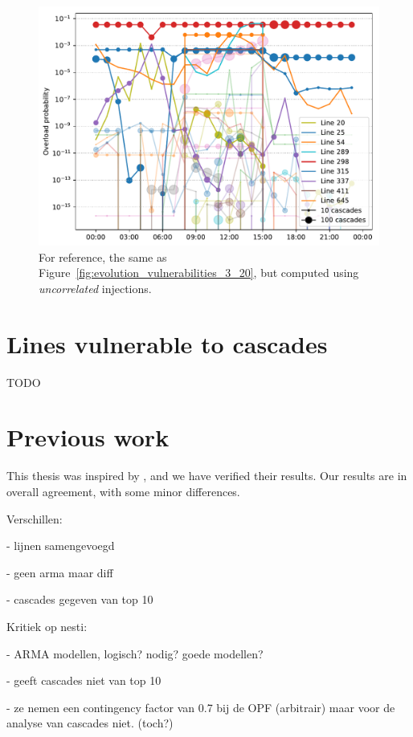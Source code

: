 \documentclass[main.tex]{subfiles}
\begin{document}
\begin{figure}[ht]
    \centering
    \includegraphics[width=\textwidth]{img/evolution_overload_probs_3_20_IID.pdf}
    \caption{For reference, the same as Figure~\ref{fig:evolution_vulnerabilities_3_20}, but computed using \emph{uncorrelated} injections.}\label{fig:evolution_vulnerabilities_3_20_IID}
\end{figure}


\section{Lines vulnerable to cascades}
\towrite{}


\begin{table}

\caption{TODO}
\label{tab:top20old}
\end{table}

\section{Previous work}
This thesis was inspired by \cite{Nesti2018emergentfailures}, and we have verified their results. Our results are in overall agreement, with some minor differences. 

Verschillen:

- lijnen samengevoegd

- geen arma maar diff

- cascades gegeven van top 10


Kritiek op nesti:

- ARMA modellen, logisch? nodig? goede modellen?

- geeft cascades niet van top 10

- ze nemen een contingency factor van 0.7 bij de OPF (arbitrair) maar voor de analyse van cascades niet. (toch?)




\clearpage
\end{document}
